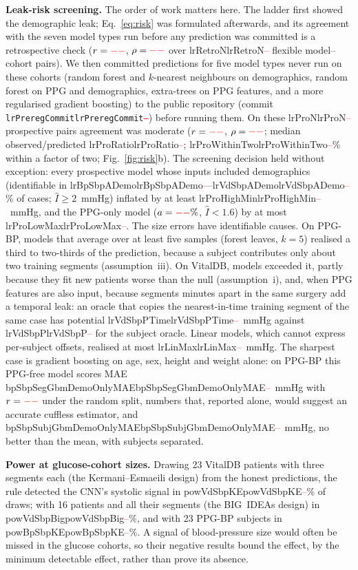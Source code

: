 \documentclass[journal]{IEEEtran}
\newcommand{\m}[1]{\ifcsname #1\endcsname\csname #1\endcsname\else\textcolor{red}{--}\fi}
\begin{document}
\textbf{Leak-risk screening.}  The order of work matters here.  The ladder
first showed the demographic leak; Eq.~\eqref{eq:risk} was formulated
afterwards, and its agreement with the seven model types run before any
prediction was committed is a retrospective check ($r=\m{lrRetroR}$, $\rho=\m{lrRetroRho}$ over \m{lrRetroN}
flexible model--cohort pairs).  We then committed predictions for five model
types never run on these cohorts (random forest and $k$-nearest neighbours on
demographics, random forest on PPG and demographics, extra-trees on PPG
features, and a more regularised gradient boosting) to the public repository
(commit \texttt{\m{lrPreregCommit}}) before running them.  On these \m{lrProN}
prospective pairs agreement was moderate ($r=\m{lrProR}$, $\rho=\m{lrProRho}$;
median observed/predicted \m{lrProRatio}; \m{lrProWithinTwo}\% within a factor of
two; Fig.~\ref{fig:risk}b).  The screening decision held without exception:
every prospective model whose inputs included demographics (identifiable in
\m{lrBpSbpADemo}--\m{lrVdSbpADemo}\% of cases; $\hat{I}\ge2$~mmHg) inflated by at least
\m{lrProHighMin}~mmHg, and the PPG-only model ($a=\m{lrVdSbpAPpg}\%$, $\hat{I}<1.6$) by at
most \m{lrProLowMax}.  The size errors have identifiable causes.  On PPG-BP, models
that average over at least five samples (forest leaves, $k=5$) realised a
third to two-thirds of the prediction, because a subject contributes only
about two training segments (assumption~iii).  On VitalDB, models exceeded it, partly because they fit new
patients worse than the null (assumption~i), and, when PPG features are also
input, because segments minutes apart in the same surgery add a temporal
leak: an oracle that copies the nearest-in-time training segment of the
same case has potential \m{lrVdSbpPTime}~mmHg against \m{lrVdSbpP} for the subject
oracle.  Linear models, which cannot express per-subject offsets,
realised at most \m{lrLinMax}~mmHg.  The sharpest case is gradient boosting on
age, sex, height and weight alone: on PPG-BP this PPG-free model scores MAE
\m{bpSbpSegGbmDemoOnlyMAE}~mmHg with $r=\m{bpSbpSegGbmDemoOnlyR}$ under the random
split, numbers that, reported alone, would suggest an accurate cuffless
estimator, and \m{bpSbpSubjGbmDemoOnlyMAE}~mmHg, no better than the mean, with
subjects separated.

\textbf{Power at glucose-cohort sizes.}  Drawing 23 VitalDB patients with
three segments each (the Kermani--Esmaeili design) from the honest
predictions, the rule detected the CNN's systolic signal in \m{powVdSbpKE}\%
of draws; with 16 patients and all their segments (the BIG~IDEAs design) in
\m{powVdSbpBig}\%, and with 23 PPG-BP subjects in \m{powBpSbpKE}\%.  A signal of
blood-pressure size would often be missed in the glucose cohorts, so their
negative results bound the effect, by the minimum detectable effect, rather
than prove its absence.
\end{document}
